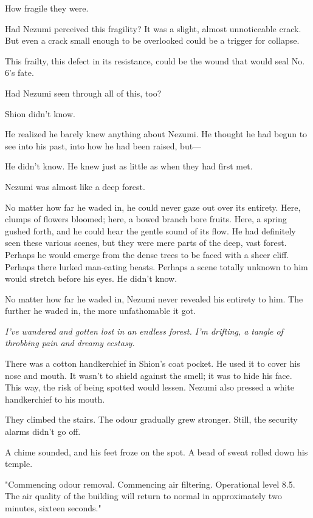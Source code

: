 How fragile they were.

Had Nezumi perceived this fragility? It was a slight, almost
unnoticeable crack. But even a crack small enough to be overlooked could
be a trigger for collapse.

This frailty, this defect in its resistance, could be the wound that
would seal No. 6's fate.

Had Nezumi seen through all of this, too?

Shion didn't know.

He realized he barely knew anything about Nezumi. He thought he had
begun to see into his past, into how he had been raised, but---

He didn't know. He knew just as little as when they had first met.

Nezumi was almost like a deep forest.

No matter how far he waded in, he could never gaze out over its
entirety. Here, clumps of flowers bloomed; here, a bowed branch bore
fruits. Here, a spring gushed forth, and he could hear the gentle sound
of its flow. He had definitely seen these various scenes, but they were
mere parts of the deep, vast forest. Perhaps he would emerge from the
dense trees to be faced with a sheer cliff. Perhaps there lurked
man-eating beasts. Perhaps a scene totally unknown to him would stretch
before his eyes. He didn't know.

No matter how far he waded in, Nezumi never revealed his entirety to
him. The further he waded in, the more unfathomable it got.

\emph{I've wandered and gotten lost in an endless forest. I'm drifting, a
tangle of throbbing pain and dreamy ecstasy.}

\mybreak

There was a cotton handkerchief in Shion's coat pocket. He used it to
cover his nose and mouth. It wasn't to shield against the smell; it was
to hide his face. This way, the risk of being spotted would lessen.
Nezumi also pressed a white handkerchief to his mouth.

They climbed the stairs. The odour gradually grew stronger. Still, the
security alarms didn't go off.

A chime sounded, and his feet froze on the spot. A bead of sweat rolled
down his temple.

"Commencing odour removal. Commencing air filtering. Operational level
8.5. The air quality of the building will return to normal in
approximately two minutes, sixteen seconds."~

